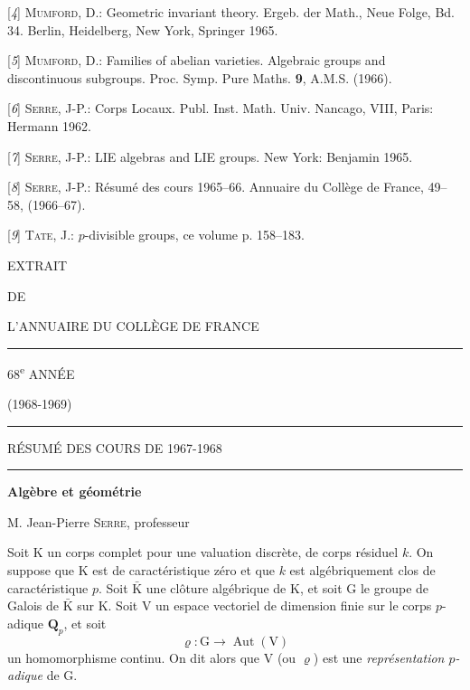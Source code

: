 [\textit{4}] \textsc{Mumford}, D.: Geometric invariant theory. Ergeb. der Math., Neue Folge, Bd. 34. Berlin, Heidelberg, New York, Springer 1965.

[\textit{5}] \textsc{Mumford}, D.: Families of abelian varieties. Algebraic groups and discontinuous subgroups. Proc. Symp. Pure Maths. \textbf{9}, A.M.S. (1966).

[\textit{6}] \textsc{Serre}, J-P.: Corps Locaux. Publ. Inst. Math. Univ. Nancago, VIII, Paris: Hermann 1962.

[\textit{7}] \textsc{Serre}, J-P.: LIE algebras and LIE groups. New York: Benjamin 1965.

[\textit{8}] \textsc{Serre}, J-P.: Résumé des cours 1965--66. Annuaire du Collège de France, 49--58, (1966--67).

[\textit{9}] \textsc{Tate}, J.: $p$-divisible groups, ce volume p. 158--183.
\begin{center}
{\Large EXTRAIT}

DE

L’ANNUAIRE DU COLLÈGE DE FRANCE

\rule{1.2cm}{0.4pt}

68\textsuperscript{e} ANNÉE

(1968-1969)

\rule{1.2cm}{0.4pt}

{\large RÉSUMÉ DES COURS DE 1967-1968}

\rule{1.8cm}{0.4pt}
\end{center}
\begin{center}
\textbf{Algèbre et géométrie}

M. Jean-Pierre \textsc{Serre}, professeur
\end{center}

Soit $\mathrm{K}$ un corps complet pour une valuation discrète, de corps résiduel $k$. On suppose que $\mathrm{K}$ est de caractéristique zéro et que $k$ est algébriquement clos de caractéristique $p$. Soit $\bar{\mathrm{K}}$ une clôture algébrique de $\mathrm{K}$, et soit $\mathrm{G}$ le groupe de Galois de $\bar{\mathrm{K}}$ sur $\mathrm{K}$. Soit $\mathrm{V}$ un espace vectoriel de dimension finie sur le corps $p$-adique $\mathbf{Q}_p$, et soit
\[
\varrho:\mathrm{G}\longrightarrow\operatorname{Aut}(\mathrm{V})
\]
un homomorphisme continu. On dit alors que $\mathrm{V}$ (ou $\varrho$) est une \textit{représentation $p$-adique} de $\mathrm{G}$.

